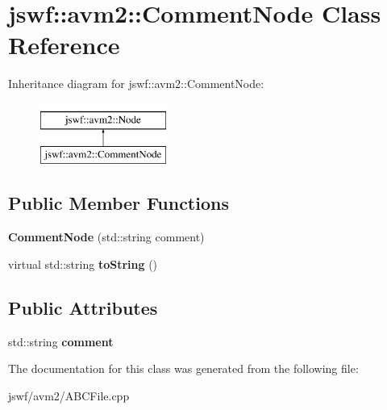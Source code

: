 \hypertarget{classjswf_1_1avm2_1_1_comment_node}{\section{jswf\+:\+:avm2\+:\+:Comment\+Node Class Reference}
\label{classjswf_1_1avm2_1_1_comment_node}
}
Inheritance diagram for jswf\+:\+:avm2\+:\+:Comment\+Node\+:\begin{figure}[H]
\begin{center}
\leavevmode
\includegraphics[height=2.000000cm]{classjswf_1_1avm2_1_1_comment_node}
\end{center}
\end{figure}
\subsection*{Public Member Functions}
\begin{DoxyCompactItemize}
\item 
\hypertarget{classjswf_1_1avm2_1_1_comment_node_afd9c807f9c60878e10081989cd710c64}{{\bfseries Comment\+Node} (std\+::string comment)}\label{classjswf_1_1avm2_1_1_comment_node_afd9c807f9c60878e10081989cd710c64}

\item 
\hypertarget{classjswf_1_1avm2_1_1_comment_node_a02550a6395aa1772c2d8d867a1943ed4}{virtual std\+::string {\bfseries to\+String} ()}\label{classjswf_1_1avm2_1_1_comment_node_a02550a6395aa1772c2d8d867a1943ed4}

\end{DoxyCompactItemize}
\subsection*{Public Attributes}
\begin{DoxyCompactItemize}
\item 
\hypertarget{classjswf_1_1avm2_1_1_comment_node_a2863ce7f8b917d17ea32b910a6aa0a48}{std\+::string {\bfseries comment}}\label{classjswf_1_1avm2_1_1_comment_node_a2863ce7f8b917d17ea32b910a6aa0a48}

\end{DoxyCompactItemize}


The documentation for this class was generated from the following file\+:\begin{DoxyCompactItemize}
\item 
jswf/avm2/A\+B\+C\+File.\+cpp\end{DoxyCompactItemize}
